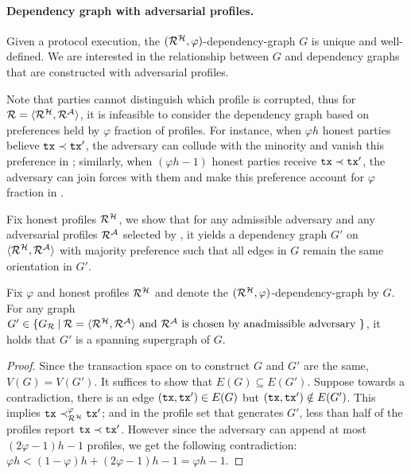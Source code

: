 \paragraph{Dependency graph with adversarial profiles.}
%
Given a protocol execution, the $(\mathcal{R}^\mathcal{H}, \varphi)$-dependency-graph $G$ is unique and well-defined.
%
We are interested in the relationship between $G$ and dependency graphs that are constructed with adversarial profiles.

Note that parties cannot distinguish which profile is corrupted, thus for $\mathcal{R} = \langle \mathcal{R}^\mathcal{H}, \mathcal{R}^\mathcal{A} \rangle$, it is infeasible to consider the dependency graph based on preferences held by $\varphi$ fraction of profiles.
%
For instance, when $\varphi h$ honest parties believe $\mathtt{tx} \prec \mathtt{tx}'$, the adversary can collude with the minority and vanish this preference in \profileSet; similarly, when $(\varphi h - 1)$ honest parties receive $\mathtt{tx} \prec \mathtt{tx}'$, the adversary can join forces with them and make this preference account for $\varphi$ fraction in \profileSet.

Fix honest profiles $\mathcal{R}^\mathcal{H}$, we show that for any admissible adversary \adv and any adversarial profiles $\mathcal{R}^\mathcal{A}$ selected by \adv, it yields a dependency graph $G'$ on $\langle \mathcal{R}^\mathcal{H}, \mathcal{R}^\mathcal{A} \rangle$ with majority preference such that all edges in $G$ remain the same orientation in $G'$.

\begin{theorem} \label{thm:profile-supergraph}
    Fix $\varphi$ and honest profiles $\mathcal{R}^\mathcal{H}$ and denote the $(\mathcal{R}^\mathcal{H}, \varphi)$-dependency-graph by $G$.
    For any graph $G' \in \{G_\mathcal{R} \mathbin| \mathcal{R} = \langle \mathcal{R}^\mathcal{H}, \mathcal{R}^\mathcal{A} \rangle \text{ and } \mathcal{R}^\mathcal{A} \text{ is chosen by an} \allowbreak \text{admissible adversary }\}$, it holds that $G'$ is a spanning supergraph of $G$.
\end{theorem}

\begin{proof}
    Since the transaction space on \profile to construct $G$ and $G'$ are the same, $V(G) = V(G')$.
    It suffices to show that $E(G) \subseteq E(G')$.
    Suppose towards a contradiction, there is an edge $(\mathtt{tx} ,\mathtt{tx}') \in E(G)$ but $(\mathtt{tx}, \mathtt{tx}') \notin E(G')$.
    This implies $\mathtt{tx} \prec^\varphi_{\mathcal{R}^\mathcal{H}} \mathtt{tx}'$; and in the profile set \profileSet that generates $G'$, less than half of the profiles report $\mathtt{tx} \prec \mathtt{tx}'$.
    However since the adversary can append at most $(2\varphi - 1)h - 1$ profiles, we get the following contradiction:
    $\varphi h < (1 - \varphi) h + (2\varphi - 1)h - 1 = \varphi h - 1.$
\end{proof}

